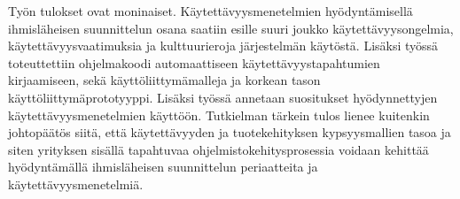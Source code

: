\documentclass[12pt,a4paper,oneside,pdftex]{report}
\begin{document}
{Työn tulokset ovat moninaiset. Käytettävyysmenetelmien hyödyntämisellä ihmisläheisen suunnittelun osana saatiin esille suuri joukko käytettävyysongelmia, käytettävyysvaatimuksia ja kulttuurieroja järjestelmän käytöstä. Lisäksi työssä toteuttettiin ohjelmakoodi automaattiseen käytettävyystapahtumien kirjaamiseen, sekä käyttöliittymämalleja ja korkean tason käyttöliittymäprototyyppi. Lisäksi työssä annetaan suositukset hyödynnettyjen käytettävyysmenetelmien käyttöön. Tutkielman tärkein tulos lienee kuitenkin johtopäätös siitä, että käytettävyyden ja tuotekehityksen kypsyysmallien tasoa ja siten yrityksen sisällä tapahtuvaa ohjelmistokehitysprosessia voidaan kehittää hyödyntämällä ihmisläheisen suunnittelun periaatteita ja käytettävyysmenetelmiä.
%
%
}
\end{document}
